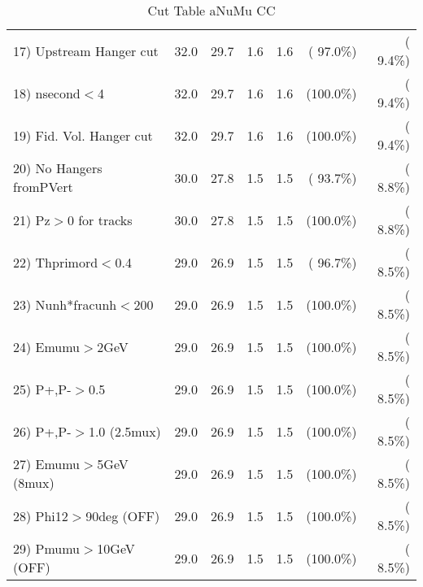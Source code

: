 \begin{table}[h!]
\begin{tabular}{||l||r|r|r|r|r|r||}
 17) Upstream Hanger cut  &         32.0 &         29.7 &          1.6 &          1.6 & ( 97.0\%) & (  9.4\%) \\
 18) nsecond$<$4          &         32.0 &         29.7 &          1.6 &          1.6 & (100.0\%) & (  9.4\%) \\
 19) Fid. Vol. Hanger cut &         32.0 &         29.7 &          1.6 &          1.6 & (100.0\%) & (  9.4\%) \\
 20) No Hangers fromPVert &         30.0 &         27.8 &          1.5 &          1.5 & ( 93.7\%) & (  8.8\%) \\
 21) Pz$>$0 for tracks    &         30.0 &         27.8 &          1.5 &          1.5 & (100.0\%) & (  8.8\%) \\
 22) Thprimord$<$0.4      &         29.0 &         26.9 &          1.5 &          1.5 & ( 96.7\%) & (  8.5\%) \\
 23) Nunh*fracunh$<$200   &         29.0 &         26.9 &          1.5 &          1.5 & (100.0\%) & (  8.5\%) \\
 24) Emumu$>$2GeV         &         29.0 &         26.9 &          1.5 &          1.5 & (100.0\%) & (  8.5\%) \\
 25) P+,P-$>$0.5          &         29.0 &         26.9 &          1.5 &          1.5 & (100.0\%) & (  8.5\%) \\
 26) P+,P-$>$1.0 (2.5mux) &         29.0 &         26.9 &          1.5 &          1.5 & (100.0\%) & (  8.5\%) \\
 27) Emumu$>$5GeV  (8mux) &         29.0 &         26.9 &          1.5 &          1.5 & (100.0\%) & (  8.5\%) \\
 28) Phi12$>$90deg  (OFF) &         29.0 &         26.9 &          1.5 &          1.5 & (100.0\%) & (  8.5\%) \\
 29) Pmumu$>$10GeV  (OFF) &         29.0 &         26.9 &          1.5 &          1.5 & (100.0\%) & (  8.5\%) \\
 \hline
 \hline
 \end{tabular}
 \caption{Cut Table  aNuMu CC }
 \label{tab-cutcohjpsi-mumu_res}
 \end{table}
